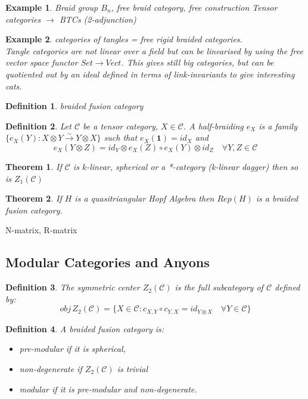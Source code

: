 \documentclass{article}
\newtheorem{definition}{Definition}
\newtheorem{example}{Example}
\newtheorem{theorem}{Theorem}
\begin{document}
\begin{example}
Braid group $B_n$, free braid category, free construction Tensor categories $\rightarrow$ BTCs (2-adjunction)
\end{example}
\begin{example}
categories of tangles = free rigid braided categories.\\
Tangle categories are not linear over a field but can be linearised by using the free vector space functor $Set \rightarrow Vect$. This gives still big categories, but can be quotiented out by an ideal defined in terms of link-invariants to give interesting cats.
\end{example}
\begin{definition}
braided fusion category
\end{definition}
\begin{definition}
Let $\mathcal{C}$ be a tensor category, $X \in \mathcal{C}$. A half-braiding $e_X$ is a family $\{ e_X(Y):X\otimes Y \xrightarrow{\sim} Y\otimes X \}$ such that $e_X(\mathbf{1}) = id_X$ and 
\begin{equation*}
e_X(Y\otimes Z) = id_Y\otimes e_X(Z) \circ e_X(Y) \otimes id_Z \quad \forall Y,Z \in \mathcal{C}
\end{equation*}
\end{definition}

\begin{theorem}
If $\mathcal{C}$ is $k$-linear, spherical or a *-category (k-linear dagger) then so is $Z_1(\mathcal{C})$ 
\end{theorem}
\begin{theorem}
If $H$ is a quasitriangular Hopf Algebra then $Rep(H)$ is a braided fusion category.
\end{theorem}

N-matrix, R-matrix


\subsection{Modular Categories and Anyons}

\begin{definition}
The symmetric center $Z_2(\mathcal{C})$ is the full subcategory of $\mathcal{C}$ defined by:
$$ obj \, Z_2(\mathcal{C}) = \{ X\in \mathcal{C} : c_{X,Y} \circ c_{Y,X} = id_{Y\otimes X} \quad \forall Y \in \mathcal{C} \} $$
\end{definition}
\begin{definition}
A braided fusion category is:
\begin{itemize}
    \item pre-modular if it is spherical,
    \item non-degenerate if $Z_2(\mathcal{C})$ is trivial
    \item modular if it is pre-modular and non-degenerate.
\end{itemize}
\end{definition}
\end{document}

